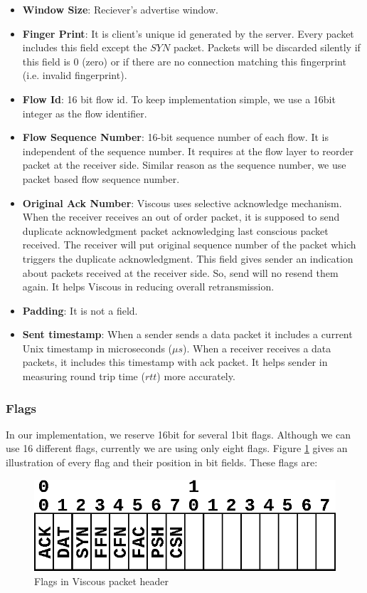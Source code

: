 \begin{itemize}
    \item \textbf{Window Size}: Reciever's advertise window.
    
    \item \textbf{Finger Print}: It is client's unique id generated by the server. Every packet includes this field except the $SYN$ packet. Packets will be discarded silently if this field is 0 (zero) or if there are no connection matching this fingerprint (i.e. invalid fingerprint).
    
    \item \textbf{Flow Id}: 16 bit flow id. To keep implementation simple, we use a 16bit integer as the flow identifier.
    
    \item \textbf{Flow Sequence Number}: 16-bit sequence number of each flow. It is independent of the sequence number. It requires at the flow layer to reorder packet at the receiver side. Similar reason as the sequence number, we use packet based flow sequence number.
    
    \item \textbf{Original Ack Number}: Viscous uses selective acknowledge mechanism. When the receiver receives an out of order packet, it is supposed to send duplicate acknowledgment packet acknowledging last conscious packet received. The receiver will put original sequence number of the packet which triggers the duplicate acknowledgment. This field gives sender an indication about packets received at the receiver side. So, send will no resend them again. It helps Viscous in reducing overall retransmission.
    
    \item \textbf{Padding}: It is not a field.
    
    \item \textbf{Sent timestamp}: When a sender sends a data packet it includes a current Unix timestamp in microseconds ($\mu s$). When a receiver receives a data packets, it includes this timestamp with ack packet. It helps sender in measuring round trip time ($rtt$) more accurately.
\end{itemize}

\subsubsection{Flags}
In our implementation, we reserve 16bit for several 1bit flags. Although we can use 16 different flags, currently we are using only eight flags. Figure \ref{fig:flags} gives an illustration of every flag and their position in bit fields. These flags are:
\begin{figure}[!h]
    \centering
    \includegraphics[width=.5\linewidth]{img/flags}
    \caption{Flags in Viscous packet header}
    \label{fig:flags}
\end{figure}

